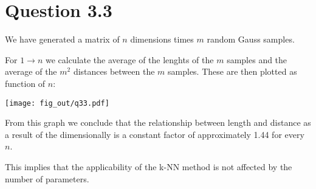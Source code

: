 \section*{Question 3.3}
We have generated a matrix of $n$ dimensions times $m$ random Gauss samples.

For $1 \to n$ we calculate the average of the lenghts of the $m$ samples and the average of the $m^2$ distances between the $m$ samples.
These are then plotted as function of $n$:

\texttt{[image: fig\_out/q33.pdf]}

From this graph we conclude that the relationship between length and distance
as a result of the dimensionally is a constant factor of approximately 1.44 for every $n$.

This implies that the applicability of the k-NN method is not affected by the number of parameters.
